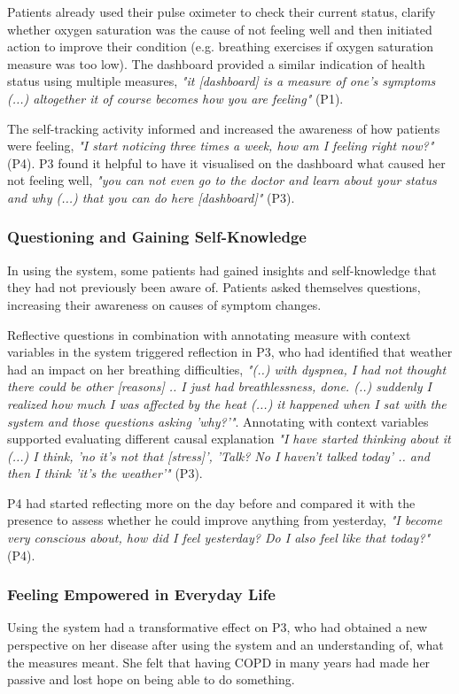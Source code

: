 Patients already used their pulse oximeter to check their current status, clarify whether oxygen saturation was the cause of not feeling well and then initiated action to improve their condition (e.g. breathing exercises if oxygen saturation measure was too low). The dashboard provided a similar indication of health status using multiple measures, \textit{"it [dashboard] is a measure of one's symptoms (...) altogether it of course becomes how you are feeling"} (P1). 

The self-tracking activity informed and increased the awareness of how patients were feeling, \textit{"I start noticing three times a week, how am I feeling right now?"} (P4). P3 found it helpful to have it visualised on the dashboard what caused her not feeling well, \textit{"you can not even go to the doctor and learn about your status and why (...) that you can do here [dashboard]"} (P3). 

\subsubsection{Questioning and Gaining Self-Knowledge}
In using the system, some patients had gained insights and self-knowledge that they had not previously been aware of. Patients asked themselves questions, increasing their awareness on causes of symptom changes. 

Reflective questions in combination with annotating measure with context variables in the system triggered reflection in P3, who had identified that weather had an impact on her breathing difficulties, \textit{"(..) with dyspnea, I had not thought there could be other [reasons] .. I just had breathlessness, done. (..) suddenly I realized how much I was affected by the heat (...) it happened when I sat with the system and those questions asking 'why?'"}. Annotating with context variables supported evaluating different causal explanation \textit{"I have started thinking about it (...) I think, 'no it's not that [stress]', 'Talk? No I haven't talked today' .. and then I think 'it's the weather'"} (P3).
 
P4 had started reflecting more on the day before and compared it with the presence to assess whether he could improve anything from yesterday, \textit{"I become very conscious about, how did I feel yesterday? Do I also feel like that today?"} (P4).

\subsubsection{Feeling Empowered in Everyday Life}
Using the system had a transformative effect on P3, who had obtained a new perspective on her disease after using the system and an understanding of, what the measures meant. She felt that having COPD in many years had made her passive and lost hope on being able to do something. 

